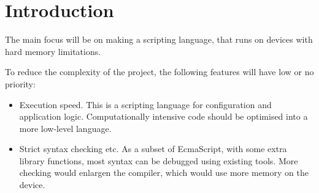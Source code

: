 \chapter{Introduction}

The main focus will be on making a scripting language, that runs on devices with hard memory limitations.

To reduce the complexity of the project, the following features will have low or no priority:
\begin{itemize}
\item Execution speed. This is a scripting language for configuration and application logic. Computationally intensive code should be optimised into a more low-level language.
\item Strict syntax checking etc. As a subset of EcmaScript, with some extra library functions, most syntax can be debugged using existing tools. More checking would enlargen the compiler, which would use more memory on the device.
\end{itemize}
